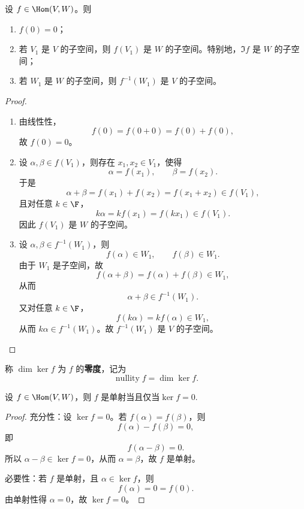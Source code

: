\begin{proposition}
	设 $f\in\Hom(V,W)$。则
	\begin{enumerate}
		\item $f(0)=0$；
		\item 若 $V_1$ 是 $V$ 的子空间，则 $f(V_1)$ 是 $W$ 的子空间。特别地，$\Im f$ 是 $W$ 的子空间；
		\item 若 $W_1$ 是 $W$ 的子空间，则 $f^{-1}(W_1)$ 是 $V$ 的子空间。
	\end{enumerate}
\end{proposition}

\begin{proof}
	\begin{enumerate}
		\item 由线性性，
		\[
		f(0)=f(0+0)=f(0)+f(0),
		\]
		故 $f(0)=0$。
		
		\item 设 $\alpha,\beta\in f(V_1)$，则存在 $x_1,x_2\in V_1$，使得
		\[
		\alpha=f(x_1),
		\qquad
		\beta=f(x_2).
		\]
		于是
		\[
		\alpha+\beta=f(x_1)+f(x_2)=f(x_1+x_2)\in f(V_1),
		\]
		且对任意 $k\in\F$，
		\[
		k\alpha=kf(x_1)=f(kx_1)\in f(V_1).
		\]
		因此 $f(V_1)$ 是 $W$ 的子空间。
		
		\item 设 $\alpha,\beta\in f^{-1}(W_1)$，则
		\[
		f(\alpha)\in W_1,
		\qquad
		f(\beta)\in W_1.
		\]
		由于 $W_1$ 是子空间，故
		\[
		f(\alpha+\beta)=f(\alpha)+f(\beta)\in W_1,
		\]
		从而
		\[
		\alpha+\beta\in f^{-1}(W_1).
		\]
		又对任意 $k\in\F$，
		\[
		f(k\alpha)=k f(\alpha)\in W_1,
		\]
		从而 $k\alpha\in f^{-1}(W_1)$。故 $f^{-1}(W_1)$ 是 $V$ 的子空间。
	\end{enumerate}
\end{proof}

\begin{definition}\label{p1:concept:c4-l1459}
	称 $\dim\ker f$ 为 $f$ 的\textbf{零度}，记为
	\[
	\operatorname{nullity}f=\dim\ker f.
	\]
\end{definition}

\begin{proposition}
	设 $f\in\Hom(V,W)$，则 $f$ 是单射当且仅当$ \ker f=0.$
\end{proposition}

\begin{proof}
	充分性：设 $\ker f=0$。若 $f(\alpha)=f(\beta)$，则
	\[
	f(\alpha)-f(\beta)=0,
	\]
	即
	\[
	f(\alpha-\beta)=0.
	\]
	所以 $\alpha-\beta\in\ker f=0$，从而 $\alpha=\beta$，故 $f$ 是单射。
	
	必要性：若 $f$ 是单射，且 $\alpha\in\ker f$，则
	\[
	f(\alpha)=0=f(0).
	\]
	由单射性得 $\alpha=0$，故 $\ker f=0$。
\end{proof}

